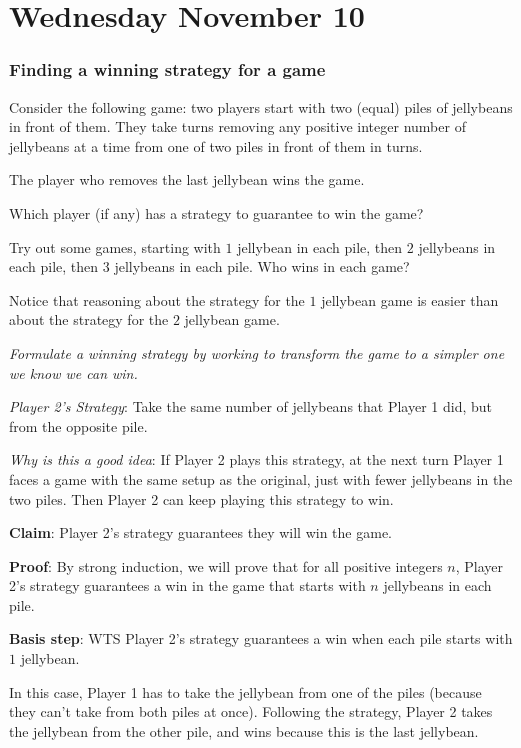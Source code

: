 \documentclass[12pt, oneside]{article}
\begin{document}
\newpage
\section*{Wednesday November 10}

\subsubsection*{Finding a winning strategy for a game}


Consider the following game: two players start with 
two (equal) piles of jellybeans in front of them.
They take turns removing any positive integer number
of jellybeans at a time from one of two piles in 
front of them in turns.

The player who removes the last jellybean wins the game.

Which player (if any) has a strategy to guarantee
to win the game?


Try out some games, starting with $1$ jellybean in each pile,
then $2$ jellybeans in each pile, then $3$ jellybeans in each pile.
Who wins in each game?

\vspace{200pt}


Notice that reasoning about the strategy for the $1$ jellybean 
game is easier than about the strategy for the $2$ jellybean game.

{\it Formulate a winning strategy by working to 
transform the game to a simpler one we know we can win.}

\newpage

{\it Player 2's Strategy}: Take the same number of jellybeans that Player 1 did, 
but from the opposite pile. 


{\it Why is this a good idea}: If Player 2 plays this strategy, at the next turn
Player 1 faces a game with the same setup as the original, just with fewer
jellybeans in the two piles. Then Player 2 can keep playing this strategy to win.

{\bf Claim}: Player 2's strategy guarantees they will win the game.

{\bf Proof}: By strong induction, we will prove that for all positive 
integers $n$, Player 2's strategy guarantees a win in the game that starts with 
$n$ jellybeans in each pile.

{\bf Basis step}: WTS Player 2's strategy guarantees a win 
when each pile starts with $1$ jellybean.

In this case, Player 1 has to take the jellybean from one of the piles
(because they can't take from both piles at once).
Following the strategy, Player 2 takes the jellybean from the 
other pile, and wins because this is the last jellybean.
\end{document}
